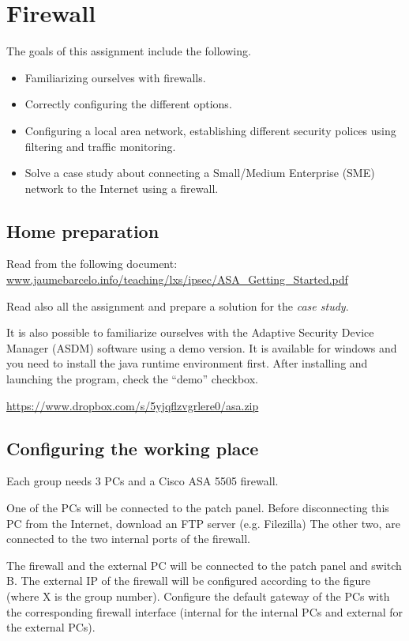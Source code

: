 \chapter{Firewall}

The goals of this assignment include the following.

\begin{itemize}
\item Familiarizing ourselves with firewalls.
\item Correctly configuring the different options.
\item Configuring a local area network, establishing different security polices using filtering and traffic monitoring.
\item Solve a case study about connecting a Small/Medium Enterprise (SME) network to the Internet using a firewall.
\end{itemize}

\section{Home preparation}

Read from the following document:
\url{www.jaumebarcelo.info/teaching/lxs/ipsec/ASA_Getting_Started.pdf}

Read also all the assignment and prepare a solution for the \emph{case study}.

It is also possible to familiarize ourselves with the Adaptive Security Device Manager (ASDM) software using a demo version.
It is available for windows and you need to install the java runtime environment first.
After installing and launching the program, check the ``demo'' checkbox.

\url{https://www.dropbox.com/s/5yjqflzvgrlere0/asa.zip}

\section{Configuring the working place}
Each group needs 3 PCs and a Cisco ASA 5505 firewall.

One of the PCs will be connected to the patch panel.
Before disconnecting this PC from the Internet, download an FTP server (e.g. Filezilla)
The other two, are connected to the two internal ports of the firewall.

The firewall and the external PC will be connected to the patch panel and switch B.
The external IP of the firewall will be configured according to the figure (where X is the group number).
Configure the default gateway of the PCs with the corresponding firewall interface (internal for the internal PCs and external for the external PCs).

